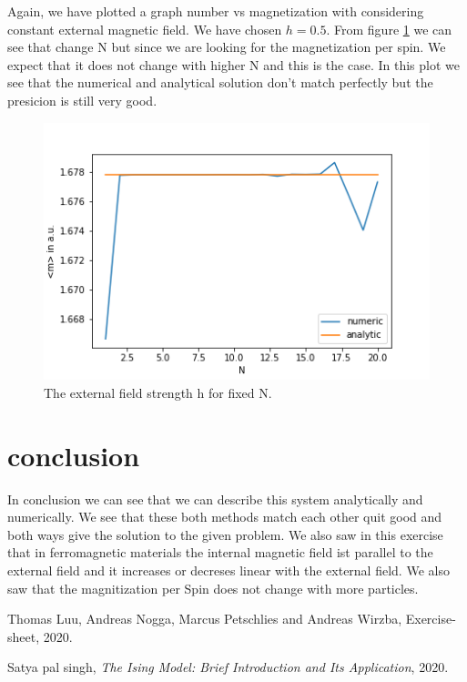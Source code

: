 \documentclass[11pt, a4paper, DIV=12]{scrartcl}
\begin{document}
Again, we have plotted a graph number vs magnetization with considering constant external magnetic field. We have chosen $h= 0.5$. From figure \ref{fig:hconst} we can see that change N but since we are looking for the magnetization per spin. We expect that it does not change with higher N and this is the case. In this plot we see that the numerical and analytical solution don't match perfectly but the presicion is still very good. 
   \begin{figure}[H]
   	\centering
   	\includegraphics[width=0.8\linewidth]{hconst.png}
   	\caption{The external field strength h for fixed N.}
   	\label{fig:hconst}
   \end{figure}
\section{conclusion}
In conclusion we can see that we can describe this system analytically and numerically. We see that these both methods match each other quit good and both ways give the solution to the given problem. We also saw in this exercise that in ferromagnetic materials the internal magnetic field ist parallel to the external field and it increases or decreses linear with the external field. We also saw that the magnitization per Spin does not change with more particles. 
\begin{thebibliography}{12}
	Thomas Luu, Andreas Nogga, Marcus Petschlies and  Andreas Wirzba, Exercise-sheet, 2020. 
		
	Satya pal singh, \textit{The Ising Model: Brief Introduction and Its Application}, 2020.
	
\end{thebibliography}
\end{document}

